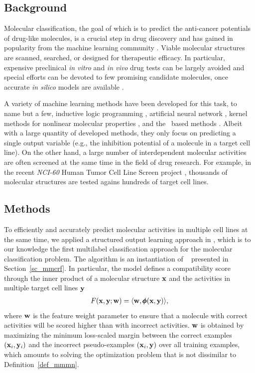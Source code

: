 {%
%
\subsection{Background}

Molecular classification, the goal of which is to predict the anti-cancer potentials of drug-like molecules, is a crucial step in drug discovery and has gained in popularity from the machine learning community \citep{Singh12qsar,Dutt12classification}.
Viable molecular structures are scanned, searched, or designed for therapeutic efficacy.
In particular, expensive preclinical \textit{in vitro} and \textit{in vivo} drug tests can be largely avoided and special efforts can be devoted to few promising candidate molecules, once accurate \textit{in silico} models are available \citep{Burbidg01drug}.

A variety of machine learning methods have been developed for this task, to name but a few, inductive logic programming \citep{King96structure}, artificial neural network \citep{Bernazzani06predicting}, kernel methods for nonlinear molecular properties \citep{Trotter01drug,Ralaivola05graph,Swamidass05kernel,Ceroni07classification}, and the \svm\ based methods \citep{Trotter01drug,Byvatov03comparison,Xue04effect}.
Albeit with a large quantity of developed methods, they only focus on predicting a single output variable (e.g., the inhibition potential of a molecule in a target cell line). 
On the other hand, a large number of interdependent molecular activities are often screened at the same time in the field of drug research.
For example, in the recent \textit{NCI-60} {Human Tumor Cell Line Screen} project \citep{Shoemaker06the}, thousands of molecular structures are tested agains hundreds of target cell lines.



%
%
\subsection{Methods}

To efficiently and accurately predict molecular activities in multiple cell lines at the same time, we applied a structured output learning approach in , which is to our knowledge the first multilabel classification approach for the molecular classification problem.
The algorithm is an instantiation of \mmcrf\ \citep{Rousu07} presented in Section~\ref{sc_mmcrf}.
In particular, the model defines a compatibility score through the inner product of a molecular structure $\mathbf {x}$ and the activities in multiple target cell lines $\mathbf {y}$
\begin{align*}
	F(\mathbf {x},\mathbf {y};\mathbf {w}) = \langle \mathbf {w}, \pmb \phi(\mathbf {x},\mathbf {y}) \rangle,
\end{align*}
where $\mathbf {w}$ is the feature weight parameter to ensure that a molecule with correct activities will be scored higher than with incorrect activities.
$\mathbf {w}$ is obtained by maximizing the minimum loss-scaled margin between the correct examples $(\mathbf {x}_i,\mathbf {y}_i)$ and the incorrect pseudo-examples $(\mathbf {x}_i,\mathbf {y})$ over all training examples, which amounts to solving the optimization problem that is not dissimilar to Definition~\ref{def_mmmn}.

}
